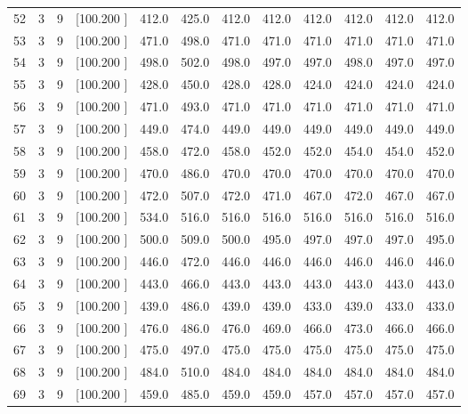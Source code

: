 \documentclass[12pt,a4paper]{article}
\begin{document}
\begin{center}
{\begin{tabular}{r r r r r r r r r r r r}
  52&  3&  9&[100.200   ]&   412.0&   425.0&   412.0&   412.0&   412.0&   412.0&   412.0&   412.0\\[-0.02in]
  53&  3&  9&[100.200   ]&   471.0&   498.0&   471.0&   471.0&   471.0&   471.0&   471.0&   471.0\\[-0.02in]
  54&  3&  9&[100.200   ]&   498.0&   502.0&   498.0&   497.0&   497.0&   498.0&   497.0&   497.0\\[-0.02in]
  55&  3&  9&[100.200   ]&   428.0&   450.0&   428.0&   428.0&   424.0&   424.0&   424.0&   424.0\\[-0.02in]
  56&  3&  9&[100.200   ]&   471.0&   493.0&   471.0&   471.0&   471.0&   471.0&   471.0&   471.0\\[-0.02in]
  57&  3&  9&[100.200   ]&   449.0&   474.0&   449.0&   449.0&   449.0&   449.0&   449.0&   449.0\\[-0.02in]
  58&  3&  9&[100.200   ]&   458.0&   472.0&   458.0&   452.0&   452.0&   454.0&   454.0&   452.0\\[-0.02in]
  59&  3&  9&[100.200   ]&   470.0&   486.0&   470.0&   470.0&   470.0&   470.0&   470.0&   470.0\\[-0.02in]
  60&  3&  9&[100.200   ]&   472.0&   507.0&   472.0&   471.0&   467.0&   472.0&   467.0&   467.0\\[-0.02in]
  61&  3&  9&[100.200   ]&   534.0&   516.0&   516.0&   516.0&   516.0&   516.0&   516.0&   516.0\\[-0.02in]
  62&  3&  9&[100.200   ]&   500.0&   509.0&   500.0&   495.0&   497.0&   497.0&   497.0&   495.0\\[-0.02in]
  63&  3&  9&[100.200   ]&   446.0&   472.0&   446.0&   446.0&   446.0&   446.0&   446.0&   446.0\\[-0.02in]
  64&  3&  9&[100.200   ]&   443.0&   466.0&   443.0&   443.0&   443.0&   443.0&   443.0&   443.0\\[-0.02in]
  65&  3&  9&[100.200   ]&   439.0&   486.0&   439.0&   439.0&   433.0&   439.0&   433.0&   433.0\\[-0.02in]
  66&  3&  9&[100.200   ]&   476.0&   486.0&   476.0&   469.0&   466.0&   473.0&   466.0&   466.0\\[-0.02in]
  67&  3&  9&[100.200   ]&   475.0&   497.0&   475.0&   475.0&   475.0&   475.0&   475.0&   475.0\\[-0.02in]
  68&  3&  9&[100.200   ]&   484.0&   510.0&   484.0&   484.0&   484.0&   484.0&   484.0&   484.0\\[-0.02in]
  69&  3&  9&[100.200   ]&   459.0&   485.0&   459.0&   459.0&   457.0&   457.0&   457.0&   457.0\\[-0.02in]

\end{tabular}}
\end{center}
\end{document}
